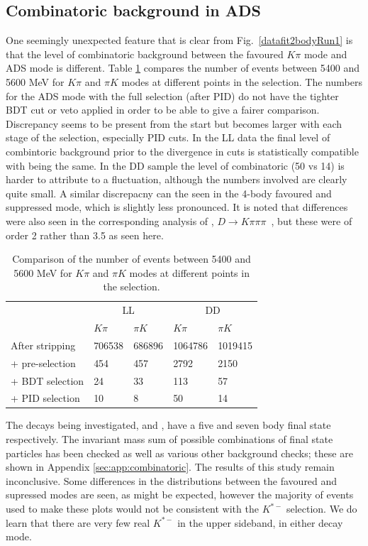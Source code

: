 \subsection{Combinatoric background in ADS}
\label{sec:cpfit:comb}

One seemingly unexpected feature that is clear from Fig.~\ref{datafit2bodyRun1} is that the level of combinatoric background between the favoured $K\pi$ mode and ADS mode is different. Table \ref{adscombinatoric} compares the number of events between 5400 and 5600 MeV for $K\pi$ and $\pi K$ modes at different points in the selection. The numbers for the ADS mode with the full selection (after PID) do not have the tighter BDT cut or veto applied in order to be able to give a fairer comparison. Discrepancy seems to be present from the start but becomes larger with each stage of the selection, especially PID cuts. In the LL data the final level of combintoric background prior to the divergence in cuts is statistically compatible with being the same. In the DD sample the level of combinatoric (50 vs 14) is harder to attribute to a fluctuation, although the numbers involved are clearly quite small. A similar discrepacny can the seen in the 4-body favoured and suppressed mode, which is slightly less pronounced. It is noted that differences were also seen in the corresponding analysis of \decay{\Bm}{\D\Km}, $D\to K\pi\pi\pi$~\cite{LHCB-PAPER-2016-003}, but these were of order 2 rather than 3.5 as seen here. 

\begin{table}[h]
\centering
\begin{tabular}{l|ll|ll}
\hline
& \multicolumn{2}{c}{LL} & \multicolumn{2}{c}{DD} \\
& $K\pi$ & $\pi K$ & $K\pi$ & $\pi K$ \\
\hline
After stripping & 706538 & 686896 & 1064786 & 1019415 \\
+ pre-selection & 454 & 457 & 2792 & 2150 \\
+ BDT selection & 24 & 33 & 113 & 57 \\
+ PID selection & 10 & 8 & 50 & 14 \\
\hline
\end{tabular}
\caption{Comparison of the number of events between 5400 and 5600 MeV for $K\pi$ and $\pi K$ modes at different points in the selection.}
\label{adscombinatoric}
\end{table}

The decays being investigated, \decay{\Bm}{\D(\Km\pip)\Kstarm(\KS(\pip\pim)\pim)} and \decay{\Bm}{\D(\Km\pip\pim\pip)\Kstarm(\KS(\pip\pim)\pim)}, have a five and seven body final state respectively. The invariant mass sum of possible combinations of final state particles has been checked as well as various other background checks; these are shown in Appendix \ref{sec:app:combinatoric}. The results of this study remain inconclusive. Some differences in the distributions between the favoured and supressed modes are seen, as might be expected, however the majority of events used to make these plots would not be consistent with the $K^{*-}$ selection. We do learn that there are very few real $K^{*-}$ in the upper sideband, in either decay mode.

